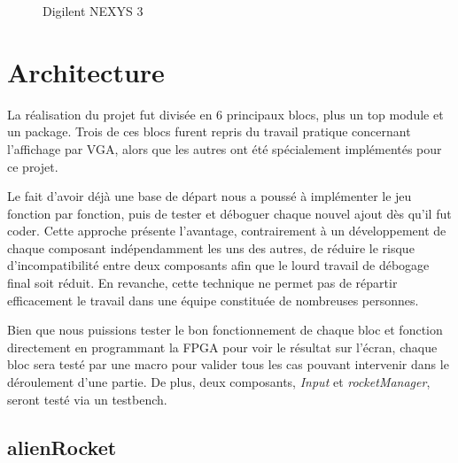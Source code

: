 \documentclass[french]{nakrule}
\begin{document}
\begin{figure}[h]
  \caption{Digilent NEXYS 3}
  \label{motherboard}
\end{figure}



\asymmetricalPage
\chapter{Architecture}
\label{architecture}

La réalisation du projet fut divisée en 6 principaux blocs, plus un top module et
un package. Trois de ces blocs furent repris du travail pratique concernant
l'affichage par VGA, alors que les autres ont été spécialement implémentés pour
ce projet.

Le fait d'avoir déjà une base de départ nous a poussé à implémenter le jeu
fonction par fonction, puis de tester et déboguer chaque nouvel ajout dès qu'il
fut coder. Cette approche présente l'avantage, contrairement à un développement
de chaque composant indépendamment les uns des autres, de réduire le risque
d'incompatibilité entre deux composants afin que le lourd travail de
débogage final soit réduit. En revanche, cette technique ne permet pas de répartir
efficacement le travail dans une équipe constituée de nombreuses personnes.

Bien que nous puissions tester le bon fonctionnement de chaque bloc et fonction
directement en programmant la FPGA pour voir le résultat sur l'écran, chaque
bloc sera testé par une macro pour valider tous les cas pouvant intervenir dans
le déroulement d'une partie. De plus, deux composants, \emph{Input} et
\emph{rocketManager}, seront testé via un testbench.

\symmetricalPage

\section{alienRocket}
\label{sec:alienRocket}
\end{document}
